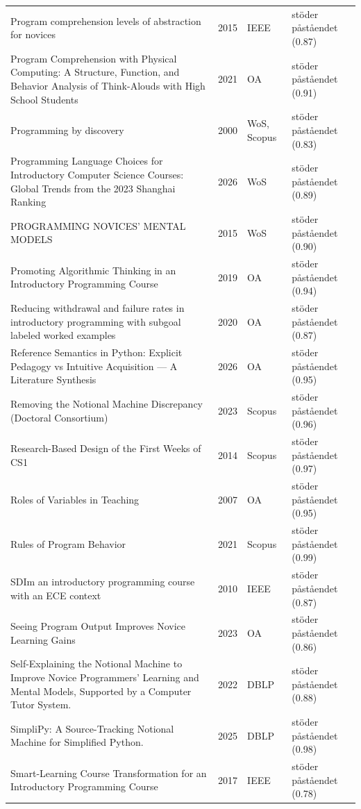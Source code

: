 \begin{longtable}{@{}%
  >{\raggedright\arraybackslash}p{}c%
  >{\raggedright\arraybackslash}p{}%
  >{\raggedright\arraybackslash}p{}@{}}
Program comprehension levels of abstraction for novices & 2015 & IEEE & stöder påståendet (0.87) \\
Program Comprehension with Physical Computing: A Structure, Function, and Behavior Analysis of Think-Alouds with High School Students & 2021 & OA & stöder påståendet (0.91) \\
Programming by discovery & 2000 & WoS, Scopus & stöder påståendet (0.83) \\
Programming Language Choices for Introductory Computer Science Courses: Global Trends from the 2023 Shanghai Ranking & 2026 & WoS & stöder påståendet (0.89) \\
PROGRAMMING NOVICES' MENTAL MODELS & 2015 & WoS & stöder påståendet (0.90) \\
Promoting Algorithmic Thinking in an Introductory Programming Course & 2019 & OA & stöder påståendet (0.94) \\
Reducing withdrawal and failure rates in introductory programming with subgoal labeled worked examples & 2020 & OA & stöder påståendet (0.87) \\
Reference Semantics in Python: Explicit Pedagogy vs Intuitive Acquisition --- A Literature Synthesis & 2026 & OA & stöder påståendet (0.95) \\
Removing the Notional Machine Discrepancy (Doctoral Consortium) & 2023 & Scopus & stöder påståendet (0.96) \\
Research-Based Design of the First Weeks of CS1 & 2014 & Scopus & stöder påståendet (0.97) \\
Roles of Variables in Teaching & 2007 & OA & stöder påståendet (0.95) \\
Rules of Program Behavior & 2021 & Scopus & stöder påståendet (0.99) \\
SDIm an introductory programming course with an ECE context & 2010 & IEEE & stöder påståendet (0.87) \\
Seeing Program Output Improves Novice Learning Gains & 2023 & OA & stöder påståendet (0.86) \\
Self-Explaining the Notional Machine to Improve Novice Programmers' Learning and Mental Models, Supported by a Computer Tutor System. & 2022 & DBLP & stöder påståendet (0.88) \\
SimpliPy: A Source-Tracking Notional Machine for Simplified Python. & 2025 & DBLP & stöder påståendet (0.98) \\
Smart-Learning Course Transformation for an Introductory Programming Course & 2017 & IEEE & stöder påståendet (0.78) \\

\end{longtable}
